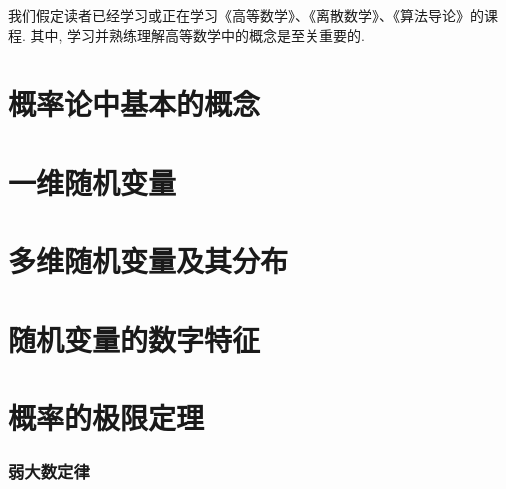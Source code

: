 
\usepackage{ctex}
\usepackage{pifont}
\usepackage{cleveref}
\usepackage{pstricks}
\usepackage{pgfplots}





我们假定读者已经学习或正在学习《高等数学》、《离散数学》、《算法导论》的课程. 其中, 学习并熟练理解高等数学中的概念是至关重要的. 

\part{概率论中基本的概念}


\begin{shaded}
    
\end{shaded}


\begin{shaded}
    
\end{shaded}

\part{一维随机变量}





\part{多维随机变量及其分布}





\part{随机变量的数字特征}








\part{概率的极限定理}



\section{弱大数定律}

